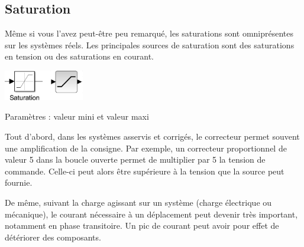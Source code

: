 \documentclass[10pt,fleqn]{article} %
\begin{document}
\subsection{Saturation}
\begin{minipage}[c]{.78\linewidth}
Même si vous l'avez peut-être peu remarqué, les saturations sont omniprésentes sur les systèmes réels. Les principales sources de saturation sont des saturations en tension ou des saturations en courant. 
\end{minipage}
\hfill
\begin{minipage}[c]{.18\linewidth}
\begin{center}
\includegraphics[width=3.5cm]{images/sat}

Paramètres : valeur mini et valeur maxi
\end{center}
\end{minipage}
Tout d'abord, dans les systèmes asservis et corrigés, le correcteur permet souvent une amplification de la consigne. Par exemple, un correcteur proportionnel de valeur 5 dans la boucle ouverte permet de multiplier par 5 la tension de commande. Celle-ci peut alors être supérieure à la tension que la source peut fournie.

De même, suivant la charge agissant sur un système (charge électrique ou mécanique), le courant nécessaire à un déplacement peut devenir très important, notamment en phase transitoire. Un pic de courant peut avoir pour effet de détériorer des composants.
\end{document}
